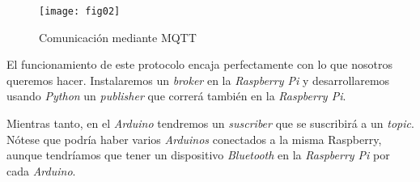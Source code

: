 \begin{figure}[h]
\texttt{[image: fig02]}
\centering
\caption{Comunicación mediante MQTT}
\end{figure}

El funcionamiento de este protocolo encaja perfectamente con lo que
nosotros queremos hacer. Instalaremos un \emph{broker} en la
\emph{Raspberry Pi} y desarrollaremos usando \emph{Python} un
\emph{publisher} que correrá también en la \emph{Raspberry Pi}.

Mientras tanto, en el \emph{Arduino} tendremos un \emph{suscriber} que
se suscribirá a un \emph{topic}. Nótese que podría haber varios
\emph{Arduinos} conectados a la misma Raspberry, aunque tendríamos que
tener un dispositivo \emph{Bluetooth} en la \emph{Raspberry Pi} por cada
\emph{Arduino}.